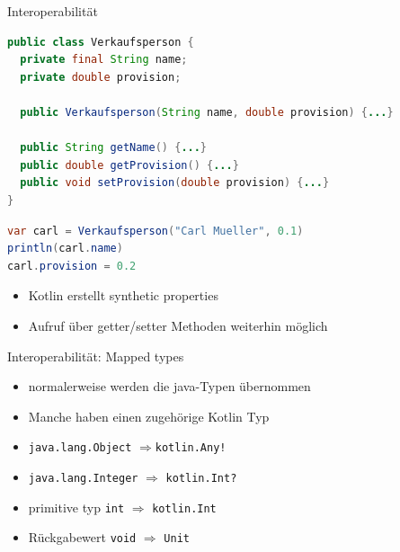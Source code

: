 \documentclass{beamer}
\begin{document}
\begin{frame}[fragile]{Interoperabilität}
  \begin{lstlisting}[language=Java]
public class Verkaufsperson {
  private final String name;
  private double provision;

  public Verkaufsperson(String name, double provision) {...}

  public String getName() {...}
  public double getProvision() {...}
  public void setProvision(double provision) {...}
}
  \end{lstlisting}
  \pause
  \begin{lstlisting}[language=Java]
var carl = Verkaufsperson("Carl Mueller", 0.1)
println(carl.name)
carl.provision = 0.2
  \end{lstlisting}
  \pause
  \begin{itemize}
    \item Kotlin erstellt synthetic properties
    \item Aufruf über getter/setter Methoden weiterhin möglich
  \end{itemize}
\end{frame}

\begin{frame}[fragile]{Interoperabilität: Mapped types}
  \begin{itemize}[<+->]
    \item normalerweise werden die java-Typen übernommen
    \item Manche haben einen zugehörige Kotlin Typ
  \end{itemize}
  \pause \vspace{0.2cm}
  \begin{itemize}[<+->]
    \item \texttt{java.lang.Object} $\Rightarrow $\texttt{kotlin.Any!}
    \item \texttt{java.lang.Integer} $\Rightarrow$ \texttt{kotlin.Int?}
    \item primitive typ \texttt{int} $\Rightarrow$ \texttt{kotlin.Int}
    \item Rückgabewert \texttt{void} $\Rightarrow$ \texttt{Unit}
  \end{itemize}
\end{frame}
\end{document}
